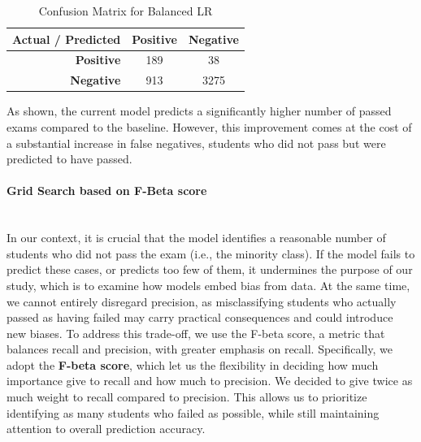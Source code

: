 \documentclass{article}
\begin{document}
\begin{table}[h!]
\centering
\caption{Confusion Matrix for Balanced LR}
\label{tab:confusion_matrix2}
\begin{tabular}{r|cc}
\toprule
\textbf{Actual / Predicted} & \textbf{Positive} & \textbf{Negative} \\
\midrule
\textbf{Positive} & 189 & 38 \\
\textbf{Negative} & 913 & 3275 \\
\bottomrule
\end{tabular}
\end{table}
As shown, the current model predicts a significantly higher number of passed exams compared to the baseline. However, this improvement comes at the cost of a substantial increase in false negatives, students who did not pass but were predicted to have passed. \newline
\paragraph{Grid Search based on F-Beta score}\mbox{}\\
In our context, it is crucial that the model identifies a reasonable number of students who did not pass the exam (i.e., the minority class). If the model fails to predict these cases, or predicts too few of them, it undermines the purpose of our study, which is to examine how models embed bias from data. At the same time, we cannot entirely disregard precision, as misclassifying students who actually passed as having failed may carry practical consequences and could introduce new biases.\newline
To address this trade-off, we use the F-beta score, a metric that balances recall and precision, with greater emphasis on recall. Specifically, we adopt the \textbf{F-beta score}, which let us the flexibility in deciding how much importance give to recall and how much to precision. We decided to give twice as much weight to recall compared to precision. This allows us to prioritize identifying as many students who failed as possible, while still maintaining attention to overall prediction accuracy.
\end{document}
